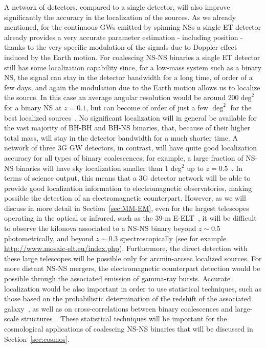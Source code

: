 A network of detectors, compared to a single detector, will also improve significantly the accuracy in the localization of the sources. As we already mentioned, for the continuous GWs emitted by spinning NSs a single ET detector  already provides a very accurate parameter estimation - including position - thanks to the very specific modulation of the signals due to Doppler effect induced by the Earth motion.   For coalescing NS-NS binaries a single ET detector  still has some localization capability since, for a low-mass system such as a binary NS, the signal can stay in the detector bandwidth for a long time,  of order of a few days, and again the modulation due to  the Earth motion allows us to localize the source. In this case  an average angular resolution would be around  $200\deg^2$\, for a binary NS at $z=0.1$, but can become of order of just a few $\deg^2$ for the best localized 
sources~\cite{Zhao:2017cbb,Chan2018}. No significant localization will in general be available for the  vast majority of BH-BH and BH-NS binaries, that, because of their higher total mass, will stay in the detector bandwidth for a much shorter time.
A  network of three 3G GW detectors, in contrast, will have quite  good localization accuracy  for all types of binary coalescences; for example, a large fraction of NS-NS binaries will have sky localization smaller than 
1 deg$^2$ up to $z=0.5$~\cite{Hall:2019xmm}. 
In terms of science output, this means that a 3G detector network will be able to provide good localization information to electromagnetic observatories, making possible the detection of an
electromagnetic counterpart. However, as we will discuss in more detail in Section~\ref{sec:MM-EM},
even for the largest telescopes operating in the optical or infrared, such as the 39-m E-ELT~\citep{ELTinstruments}, it will be difficult to observe the kilonova associated to a NS-NS binary beyond $z\sim 0.5$ photometrically, and beyond $z\sim 0.3$ spectroscopically \citep{Chornock:2019rrt,Clenet2013} (see for example \url{http://www.mosaic-elt.eu/index.php}). 
Furthermore, the direct detection with these large telescopes will be possible only for arcmin-arcsec localized sources.
For more distant NS-NS mergers,  the electromagnetic counterpart detection would be possible through the associated emission of gamma-ray bursts. Accurate localization would
be also important in order to use statistical techniques, such as those based on the probabilistic determination of the redshift of the associated galaxy~\cite{Schutz:1986gp,DelPozzo:2011yh},  as well as on cross-correlations between binary coalescences and large-scale structures~\cite{Mukherjee:2018ebj,Scelfo:2018sny}.
These statistical techniques will be important for the cosmological applications of coalescing NS-NS binaries that will be discussed in Section~\ref{sec:cosmos}. 

